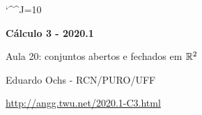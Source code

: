 \documentclass[oneside,12pt]{article}
\begin{document}
\catcode`\^^J=10


\long{}
\long{}
\long{}
\long{}
\long{}
\long{}
\long{}
\long{}
\long{}
\long{}

\long{}
\long{}

\def\frown{\ensuremath{{=}{(}}}
\def\True {\mathbf{V}}
\def\False{\mathbf{F}}

\def\drafturl{http://angg.twu.net/LATEX/2020-1-C2.pdf}
\def\drafturl{http://angg.twu.net/2020.1-C2.html}
\def\draftfooter{\tiny \href{\drafturl}{\jobname{}} \ColorBrown{\shorttoday{} \hours}}


%

\thispagestyle{empty}

\begin{center}

\vspace*{1.2cm}

{\bf \Large Cálculo 3 - 2020.1}

\bsk

Aula 20: conjuntos abertos e fechados em $\mathbb{R}^2$

\bsk

Eduardo Ochs - RCN/PURO/UFF

\url{http://angg.twu.net/2020.1-C3.html}

\end{center}

\newpage

\end{document}
